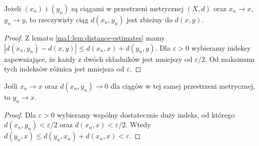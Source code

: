 \begin{twierdzenie}
\label{ma1:thm:distance-limit}
Jeżeli $(x_n)$ i $(y_n)$ są ciągami w przestrzeni metrycznej $(X,d)$ oraz $x_n\to x$, $y_n\to y$, to rzeczywisty ciąg $d(x_n,y_n)$ jest zbieżny do $d(x,y)$.
\end{twierdzenie}
\begin{proof}
Z lematu \ref{ma1:lem:distance-estimates} mamy $|d(x_n,y_n)-d(x,y)|\le d(x_n,x)+d(y_n,y)$. Dla $\varepsilon>0$ wybieramy indeksy zapewniające, że każdy z dwóch składników jest mniejszy od $\varepsilon/2$. Od maksimum tych indeksów różnica jest mniejsza od $\varepsilon$.
\end{proof}
\begin{wniosek}
\label{ma1:cor:asymptotic-equivalence}
Jeśli $x_n\to x$ oraz $d(x_n,y_n)\to0$ dla ciągów w tej samej przestrzeni metrycznej, to $y_n\to x$.
\end{wniosek}
\begin{proof}
Dla $\varepsilon>0$ wybieramy wspólny dostatecznie duży indeks, od którego $d(x_n,y_n)<\varepsilon/2$ oraz $d(x_n,x)<\varepsilon/2$. Wtedy $d(y_n,x)\le d(y_n,x_n)+d(x_n,x)<\varepsilon$.
\end{proof}


